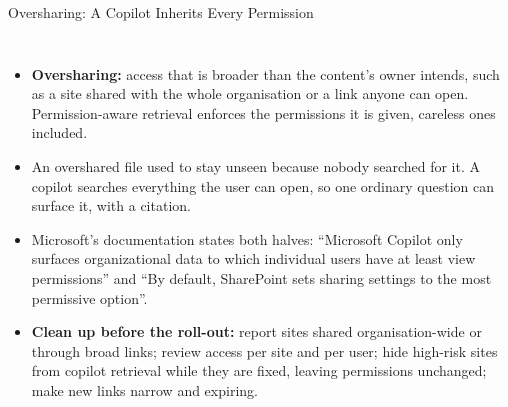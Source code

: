 \begin{frame}{Oversharing: A Copilot Inherits Every Permission}
  \begin{columns}[T,onlytextwidth]
      \begin{itemize}\scriptsize\itemsep0.45em
        \item[\textcolor{red}{$\blacktriangleright$}] \textbf{Oversharing:} access that is broader than the content's owner intends, such as a site shared with the whole organisation or a link anyone can open. Permission-aware retrieval enforces the permissions it is given, careless ones included.
        \item[\textcolor{red}{$\blacktriangleright$}] An overshared file used to stay unseen because nobody searched for it. A copilot searches everything the user can open, so one ordinary question can surface it, with a citation.
        \item[\textcolor{red}{$\blacktriangleright$}] Microsoft's documentation states both halves: ``Microsoft Copilot only surfaces organizational data to which individual users have at least view permissions'' and ``By default, SharePoint sets sharing settings to the most permissive option''.
        \item[\textcolor{red}{$\blacktriangleright$}] \textbf{Clean up before the roll-out:} report sites shared organisation-wide or through broad links; review access per site and per user; hide high-risk sites from copilot retrieval while they are fixed, leaving permissions unchanged; make new links narrow and expiring.
      \end{itemize}
      \centering
      \vspace{0.8em}
\end{columns}
\end{frame}
